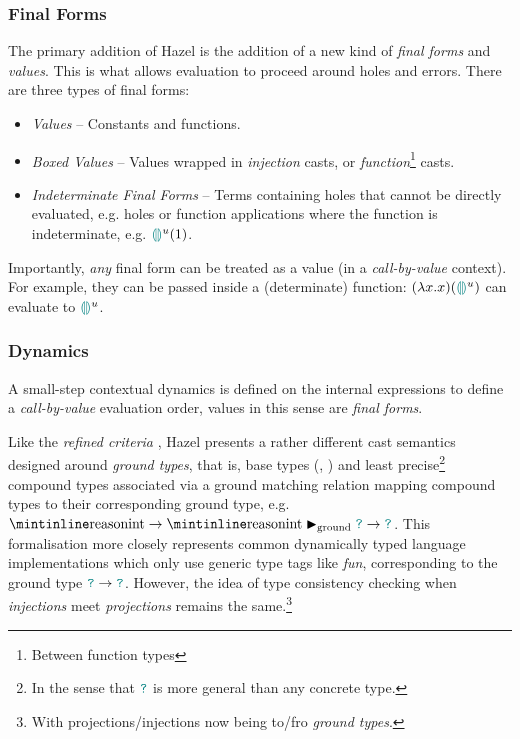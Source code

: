 \subsubsection{Final Forms}\label{sec:HazelFinalForms}
The primary addition of Hazel is the addition of a new kind of \textit{final forms} and \textit{values}. This is what allows evaluation to proceed around holes and errors. There are three types of final forms:
\begin{itemize}
\item \textit{Values} -- Constants and functions.
\item \textit{Boxed Values} -- Values wrapped in \textit{injection} casts, or \textit{function}\footnote{Between function types} casts.
\item \textit{Indeterminate Final Forms} -- Terms containing holes that cannot be directly evaluated, e.g. holes or function applications where the function is indeterminate, e.g. ${\color{teal}\llparenthesis}  {\color{teal}\rrparenthesis}^u(1)$.
\end{itemize}
 Importantly, \textit{any} final form can be treated as a value (in a \textit{call-by-value} context). For example, they can be passed inside a (determinate) function: $(\lambda x. x)({\color{teal}\llparenthesis}  {\color{teal}\rrparenthesis}^u)$ can evaluate to ${\color{teal}\llparenthesis}  {\color{teal}\rrparenthesis}^u$.

\subsubsection{Dynamics}\label{sec:HazelDynamics}
A small-step contextual dynamics \cite[ch. 5]{PracticalFoundations} is defined on the internal expressions to define a \textit{call-by-value} evaluation order, values in this sense are \textit{final forms}. 

Like the \textit{refined criteria}  \cite{GradualRefined}, Hazel presents a rather different cast semantics designed around \textit{ground types}, that is, base types (, ) and least precise\footnote{In the sense that ${\color{teal}\texttt{?}}$ is more general than any concrete type.} compound types associated via a ground matching relation mapping compound types to their corresponding ground type, e.g. $\code{int} \to \code{int} \groundmatch \dyn \to \dyn$. This formalisation more closely represents common dynamically typed language implementations which only use generic type tags like \textit{fun}, corresponding to the ground type ${\color{teal}\texttt{?}} \to {\color{teal}\texttt{?}}$. However, the idea of type consistency checking when \textit{injections} meet \textit{projections} remains the same.\footnote{With projections/injections now being to/fro \textit{ground types}.}


